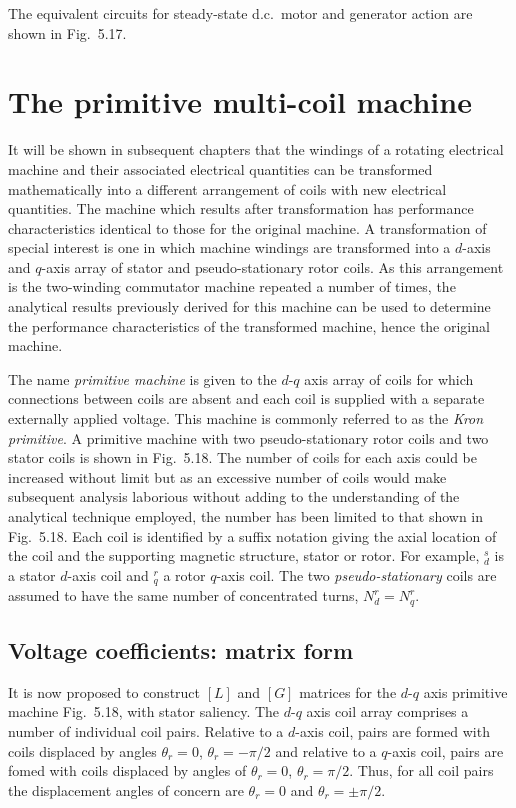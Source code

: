 \documentclass[a4paper,numbers=noenddot,12pt]{scrbook}
\begin{document}
The equivalent circuits for steady-state d.c.\ motor and generator action are shown in Fig.\ 5.17.

\section{The primitive multi-coil machine}
It will be shown in subsequent chapters that the windings of a rotating electrical machine and their associated electrical quantities can be transformed mathematically into a different arrangement of coils with new electrical quantities. The machine which results after transformation has performance characteristics identical to those for the original machine. A transformation of special interest is one in which machine windings are transformed into a $d$-axis and $q$-axis array of stator and pseudo-stationary rotor coils. As this arrangement is the two-winding commutator machine repeated a number of times, the analytical results previously derived for this machine can be used to determine the performance characteristics of the transformed machine, hence the original machine.

The name \emph{primitive machine} is given to the $d$-$q$ axis array of coils for which connections between coils are absent and each coil is supplied with a separate externally applied voltage. This machine is commonly referred to as the \emph{Kron primitive}. A primitive machine with two pseudo-stationary rotor coils and two stator coils is shown in Fig.\ 5.18. The number of coils for each axis could be increased without limit but as an excessive number of coils would make subsequent analysis laborious without adding to the understanding of the analytical technique employed, the number has been limited to that shown in Fig.\ 5.18. Each coil is identified by a suffix notation giving the axial location of the coil and the supporting magnetic structure, stator or rotor. For example, $_d^s$ is a stator $d$-axis coil and $_q^r$ a rotor $q$-axis coil. The two \emph{pseudo-stationary} coils are assumed to have the same number of concentrated turns, $N_d^r = N_q^r$.
\subsection{Voltage coefficients: matrix form} 
It is now proposed to construct $[L]$ and $[G]$ matrices for the $d$-$q$ axis primitive machine Fig.\ 5.18, with stator saliency. The $d$-$q$ axis coil array comprises a number of individual coil pairs. Relative to a $d$-axis coil, pairs are formed with coils displaced by angles $\theta_r = 0$, $\theta_r = -\pi/2$ and relative to a $q$-axis coil, pairs are fomed with coils displaced by angles of $\theta_r = 0$, $\theta_r = \pi/2$. Thus, for all coil pairs the displacement angles of concern are $\theta_r = 0$ and $\theta_r = \pm \pi / 2$.
\end{document}
